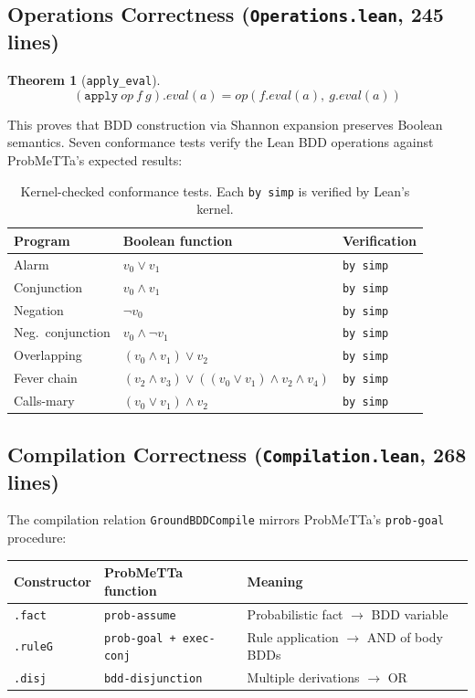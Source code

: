 \documentclass[11pt,a4paper]{article}
\theoremstyle{definition}
\newtheorem{theorem}{Theorem}[section]
\begin{document}
\subsection{Operations Correctness (\texttt{Operations.lean}, 245 lines)}

\begin{theorem}[\texttt{apply\_eval}]
\[
(\texttt{apply}\ \mathit{op}\ f\ g).\mathit{eval}(a) = \mathit{op}(f.\mathit{eval}(a),\ g.\mathit{eval}(a))
\]
\end{theorem}

This proves that BDD construction via Shannon expansion preserves Boolean
semantics. Seven conformance tests verify the Lean BDD operations against
ProbMeTTa's expected results:

\begin{table}[h]
\centering
\begin{tabular}{lll}
\toprule
\textbf{Program} & \textbf{Boolean function} & \textbf{Verification} \\
\midrule
Alarm & $v_0 \vee v_1$ & \texttt{by simp} \\
Conjunction & $v_0 \wedge v_1$ & \texttt{by simp} \\
Negation & $\neg v_0$ & \texttt{by simp} \\
Neg.~conjunction & $v_0 \wedge \neg v_1$ & \texttt{by simp} \\
Overlapping & $(v_0 \wedge v_1) \vee v_2$ & \texttt{by simp} \\
Fever chain & $(v_2 \wedge v_3) \vee ((v_0 \vee v_1) \wedge v_2 \wedge v_4)$ & \texttt{by simp} \\
Calls-mary & $(v_0 \vee v_1) \wedge v_2$ & \texttt{by simp} \\
\bottomrule
\end{tabular}
\caption{Kernel-checked conformance tests. Each \texttt{by simp} is verified by Lean's kernel.}
\end{table}

\subsection{Compilation Correctness (\texttt{Compilation.lean}, 268 lines)}

The compilation relation \texttt{GroundBDDCompile} mirrors ProbMeTTa's
\texttt{prob-goal} procedure:

\begin{center}
\begin{tabular}{lll}
\toprule
\textbf{Constructor} & \textbf{ProbMeTTa function} & \textbf{Meaning} \\
\midrule
\texttt{.fact} & \texttt{prob-assume} & Probabilistic fact $\to$ BDD variable \\
\texttt{.ruleG} & \texttt{prob-goal + exec-conj} & Rule application $\to$ AND of body BDDs \\
\texttt{.disj} & \texttt{bdd-disjunction} & Multiple derivations $\to$ OR \\
\bottomrule
\end{tabular}
\end{center}
\end{document}
